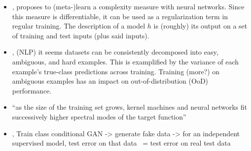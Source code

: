\begin{itemize}
    \item \citet{lee2020neural}, proposes to (meta-)learn a complexity measure with neural networks. Since this measure is differentiable, it can be used as a regularization term in regular training. The description of a model $h$ is (roughly) its output on a set of training and test inputs (plus said inputs).
    \item \citet{swayamdipta2020dataset}, (NLP) it seems datasets can be consistently decomposed into easy, ambiguous, and hard examples. This is examplified by the variance of each example's true-class predictions across training. Training (more?) on ambiguous examples has an impact on out-of-distribution (OoD) performance.
    \item \citet{bordelon2020spectrum} ``as the size of the training set grows, kernel machines and neural networks fit successively higher spectral modes of the target function''
    \item \citet{zhang2022on}, Train class conditional GAN -> generate fake data -> for an independent supervised model, test error on that data ~= test error on real test data
\end{itemize}

